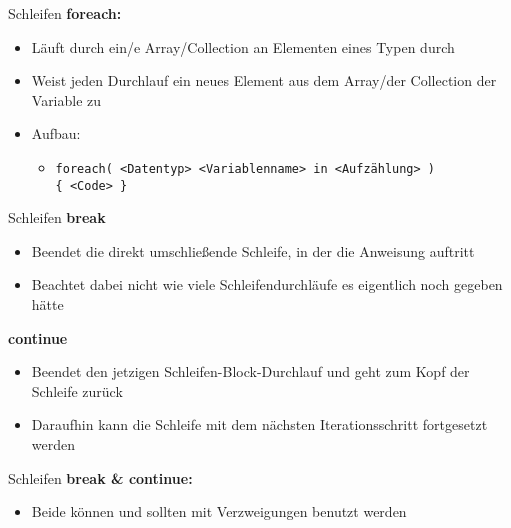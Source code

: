 \begin{frame}{Schleifen}
	\textbf{foreach:} \\
	\begin{itemize}
		\item Läuft durch ein/e Array/Collection an Elementen eines Typen durch 
		\item Weist jeden Durchlauf ein neues Element aus dem Array/der Collection der Variable zu 
		\item Aufbau:
		\begin{itemize}
			\item \alert{\texttt{foreach( <Datentyp> <Variablenname> in <Aufzählung> )\\ \{ <Code> \}}}
		\end{itemize}
	\end{itemize}
		
\end{frame}

\begin{frame}{Schleifen}
	\textbf{break}\\
	\begin{itemize}
		\item Beendet die direkt umschließende Schleife, in der die Anweisung auftritt
		\item Beachtet dabei nicht wie viele Schleifendurchläufe es eigentlich noch gegeben hätte
	\end{itemize}
	\textbf{continue}\\
	\begin{itemize}
		\item Beendet den jetzigen Schleifen-Block-Durchlauf und geht zum Kopf der Schleife zurück
		\item Daraufhin kann die Schleife mit dem nächsten Iterationsschritt fortgesetzt werden
	\end{itemize}
\end{frame}

\begin{frame}{Schleifen}
	\textbf{break \& continue:}\\
	\begin{itemize}
		\item Beide können und sollten mit Verzweigungen benutzt werden
	\end{itemize}
	
\end{frame}


